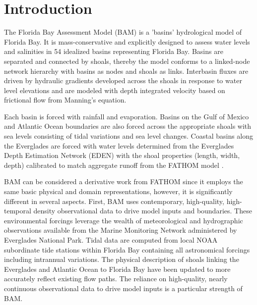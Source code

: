 \section{Introduction}
\label{sec:Introduction}
The Florida Bay Assessment Model (BAM) is a 'basins' hydrological model of Florida Bay.  It is mass-conservative and explicitly designed to assess water levels and salinities in 54 idealized basins representing Florida Bay.  Basins are separated and connected by shoals, thereby the model conforms to a linked-node network hierarchy with basins as nodes and shoals as links.  Interbasin fluxes are driven by hydraulic gradients developed across the shoals in response to water level elevations and are modeled with depth integrated velocity based on frictional flow from Manning's equation.  

Each basin is forced with rainfall and evaporation.  Basins on the Gulf of Mexico and Atlantic Ocean boundaries are also forced across the appropriate shoals with sea levels consisting of tidal variations and sea level changes.  Coastal basins along the Everglades are forced with water levels determined from the Everglades Depth Estimation Network (EDEN) \citep{Telis2014} with the shoal properties (length, width, depth) calibrated to match aggregate runoff from the FATHOM model \citep{Cosby2010}.

BAM can be considered a derivative work from FATHOM since it employs the same basic physical and domain representations, however, it is significantly different in several aspects.  First, BAM uses contemporary, high-quality, high-temporal density observational data to drive model inputs and boundaries.  These environmental forcings leverage the wealth of meteorological and hydrographic observations available from the Marine Monitoring Network administered by Everglades National Park.  Tidal data are computed from local NOAA subordinate tide stations within Florida Bay containing all astronomical forcings including intrannual variations.  The physical description of shoals linking the Everglades and Atlantic Ocean to Florida Bay have been updated to more accurately reflect existing flow paths.  The reliance on high-quality, nearly continuous observational data to drive model inputs is a particular strength of BAM.

